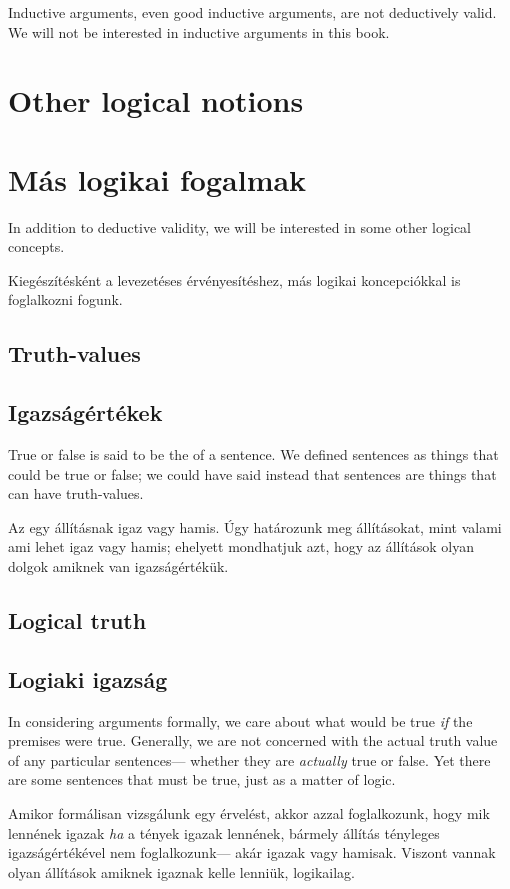 Inductive arguments, even good inductive arguments, are not deductively valid. We will not be interested in inductive arguments in this book.


\section*{Other logical notions}
\section{Más logikai fogalmak}

In addition to deductive validity, we will be interested in some other logical concepts.

Kiegészítésként a levezetéses érvényesítéshez, más logikai koncepciókkal is foglalkozni fogunk.

\subsection*{Truth-values}
\subsection{Igazságértékek}
True or false is said to be the  of a sentence. We defined sentences as things that could be true or false; we could have said instead that sentences are things that can have truth-values.

Az  egy állításnak igaz vagy hamis. Úgy határozunk meg állításokat, mint valami ami lehet igaz vagy hamis; ehelyett mondhatjuk azt, hogy az állítások olyan dolgok amiknek van igazságértékük.

\subsection*{Logical truth}
\subsection{Logiaki igazság}

In considering arguments formally, we care about what would be true \emph{if} the premises were true. Generally, we are not concerned with the actual truth value of any particular sentences--- whether they are \emph{actually} true or false. Yet there are some sentences that must be true, just as a matter of logic.

Amikor formálisan vizsgálunk egy érvelést, akkor azzal foglalkozunk, hogy mik lennének igazak \emph{ha} a tények igazak lennének, bármely állítás tényleges igazságértékével nem foglalkozunk--- akár igazak vagy hamisak. Viszont vannak olyan állítások amiknek igaznak kelle lenniük, logikailag.

